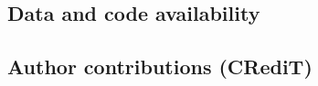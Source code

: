 \documentclass[times,sagev]{sagej}
\begin{document}
\subsection*{Data and code availability}

\subsection*{Author contributions (CRediT)}


\end{document}

